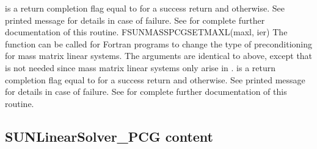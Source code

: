 {
   is a  return completion flag equal to  for a success
  return and  otherwise. See printed message for details in case
  of failure.
}
{
  See  for complete further
  documentation of this routine.
}
%
%
{
  FSUNMASSPCGSETMAXL(maxl, ier)
}
{
  The function  can be called for Fortran
  programs to change the type of preconditioning for mass matrix
  linear systems.
}
{
  The arguments are identical to  above, except that
   is not needed since mass matrix linear systems only arise
  in {\arkode}.
}
{
   is a  return completion flag equal to  for a success
  return and  otherwise. See printed message for details in case
  of failure.
}
{
  See  for complete further
  documentation of this routine.
}
%
%

\subsection{SUNLinearSolver\_PCG content}
\label{ss:sunlinsol_pcg_content}

